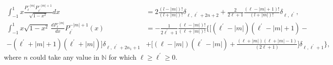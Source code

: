 \begin{align}
    \int_{-1}^{1} x \frac{P_{\ell}^{-|m|} P_{\ell^{\prime}}^{-|m|+1}}{\sqrt{1-x^2}} dx &= 2 \frac{(l-|m|)!}{(l+|m|)!}\delta_{\ell,\ell^{\prime}+2n+2}+\frac{2}{2\ell+1}\frac{(\ell-|m|+1)!}{(l+|m|)!}\delta_{\ell,\ell^{\prime}},\\
   \int_{-1}^{1} x\sqrt{1-x^2} \,\frac{dP_{\ell}^{-|m|}}{dx} P_{\ell^{\prime}}^{-|m|+1} (x) &= -\frac{1}{2\ell^{\prime}+1}\frac{(\ell-|m|)!}{(\ell+|m|)!} \Big\{\Big[(\ell^{\prime}-|m|)(\ell^{\prime}-|m|+1)-\nonumber\\
   -(\ell^{\prime}+|m|+1)(\ell^{\prime}+|m|)\Big]\delta_{\ell,\ell^{\prime}+ 2n_1 +1} &+\Big[(\ell-|m|)(\ell^{\prime}-|m|)+\frac{(\ell+|m|)(\ell+|m|-1)}{(2\ell+1)}\Big]\delta_{\ell,\ell^{\prime}+1} \Big\},
\end{align}
where $n$ could take any value in $\mathbb{N}$ for which $\ell \geq \ell^{\prime} \geq 0$.  
